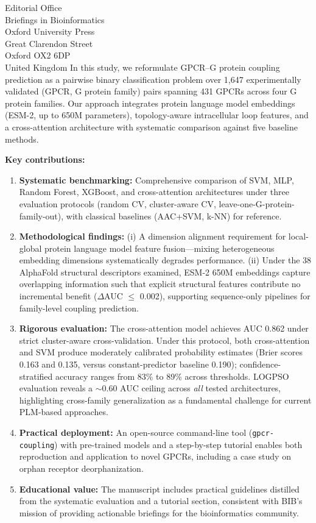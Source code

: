 \documentclass[11pt]{letter}
\begin{document}
\begin{letter}{Editorial Office\\
Briefings in Bioinformatics\\
Oxford University Press\\
Great Clarendon Street\\
Oxford OX2 6DP\\
United Kingdom}
In this study, we reformulate GPCR--G protein coupling prediction as a pairwise binary classification problem over 1,647 experimentally validated (GPCR, G protein family) pairs spanning 431 GPCRs across four G protein families. Our approach integrates protein language model embeddings (ESM-2, up to 650M parameters), topology-aware intracellular loop features, and a cross-attention architecture with systematic comparison against five baseline methods.

\textbf{Key contributions:}

\begin{enumerate}
    \item \textbf{Systematic benchmarking:} Comprehensive comparison of SVM, MLP, Random Forest, XGBoost, and cross-attention architectures under three evaluation protocols (random CV, cluster-aware CV, leave-one-G-protein-family-out), with classical baselines (AAC+SVM, k-NN) for reference.

    \item \textbf{Methodological findings:} (i) A dimension alignment requirement for local-global protein language model feature fusion---mixing heterogeneous embedding dimensions systematically degrades performance. (ii) Under the 38 AlphaFold structural descriptors examined, ESM-2 650M embeddings capture overlapping information such that explicit structural features contribute no incremental benefit ($\Delta$AUC $\le$ 0.002), supporting sequence-only pipelines for family-level coupling prediction.

    \item \textbf{Rigorous evaluation:} The cross-attention model achieves AUC 0.862 under strict cluster-aware cross-validation. Under this protocol, both cross-attention and SVM produce moderately calibrated probability estimates (Brier scores 0.163 and 0.135, versus constant-predictor baseline 0.190); confidence-stratified accuracy ranges from 83\% to 89\% across thresholds. LOGPSO evaluation reveals a $\sim$0.60 AUC ceiling across \textit{all} tested architectures, highlighting cross-family generalization as a fundamental challenge for current PLM-based approaches.

    \item \textbf{Practical deployment:} An open-source command-line tool (\texttt{gpcr-coupling}) with pre-trained models and a step-by-step tutorial enables both reproduction and application to novel GPCRs, including a case study on orphan receptor deorphanization.

    \item \textbf{Educational value:} The manuscript includes practical guidelines distilled from the systematic evaluation and a tutorial section, consistent with BIB's mission of providing actionable briefings for the bioinformatics community.
\end{enumerate}


\end{letter}
\end{document}
